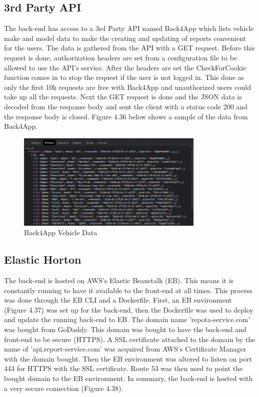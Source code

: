 \subsection{3rd Party API}
The back-end has access to a 3rd Party API named Back4App which lists vehicle make and model data to make the creating and updating of reports convenient for the users. The data is gathered from the API with a GET request. Before this request is done, authorization headers are set from a configuration file to be allowed to use the API's service. After the headers are set the CheckForCookie function comes in to stop the request if the user is not logged in. This done as only the first 10k requests are free with Back4App and unauthorized users could take up all the requests. Next the GET request is done and the JSON data is decoded from the response body and sent the client with a status code 200 and the response body is closed. Figure 4.36 below shows a sample of the data from Back4App.

\begin{figure}[H]
    \caption{Back4App Vehicle Data}
    \label{image:back4app}
    \centering
    \includegraphics[width=0.8\textwidth]{images/horton/back4app/back4app_data.png}
\end{figure}

\subsection{Elastic Horton}
The back-end is hosted on AWS's Elastic Beanstalk (EB). This means it is constantly running to have it available to the front-end at all times. This process was done through the EB CLI and a Dockerfile. First, an EB environment (Figure 4.37) was set up for the back-end, then the Dockerfile was used to deploy and update the running back-end to EB. The domain name 'repota-service.com' was bought from GoDaddy. This domain was bought to have the back-end and front-end to be secure (HTTPS). A SSL certificate attached to the domain by the name of 'api.report-service.com' was acquired from AWS's Certificate Manager with the domain bought. Then the EB environment was altered to listen on port 443 for HTTPS with the SSL certificate. Route 53 was then used to point the bought domain to the EB environment. In summary, the back-end is hosted with a very secure connection (Figure 4.38).

